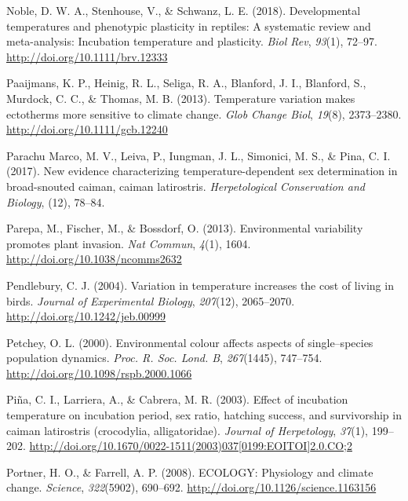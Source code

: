 \documentclass[12pt,twoside]{reedthesis}
\begin{document}
\leavevmode\hypertarget{ref-noble_developmental_2018}{}%
Noble, D. W. A., Stenhouse, V., \& Schwanz, L. E. (2018). Developmental temperatures and phenotypic plasticity in reptiles: A systematic review and meta-analysis: Incubation temperature and plasticity. \emph{Biol Rev}, \emph{93}(1), 72--97. \url{http://doi.org/10.1111/brv.12333}

\leavevmode\hypertarget{ref-paaijmans_temperature_2013}{}%
Paaijmans, K. P., Heinig, R. L., Seliga, R. A., Blanford, J. I., Blanford, S., Murdock, C. C., \& Thomas, M. B. (2013). Temperature variation makes ectotherms more sensitive to climate change. \emph{Glob Change Biol}, \emph{19}(8), 2373--2380. \url{http://doi.org/10.1111/gcb.12240}

\leavevmode\hypertarget{ref-parachu_marco_new_2017}{}%
Parachu Marco, M. V., Leiva, P., Iungman, J. L., Simonici, M. S., \& Pina, C. I. (2017). New evidence characterizing temperature-dependent sex determination in broad-snouted caiman, caiman latirostris. \emph{Herpetological Conservation and Biology}, (12), 78--84.

\leavevmode\hypertarget{ref-parepa_environmental_2013}{}%
Parepa, M., Fischer, M., \& Bossdorf, O. (2013). Environmental variability promotes plant invasion. \emph{Nat Commun}, \emph{4}(1), 1604. \url{http://doi.org/10.1038/ncomms2632}

\leavevmode\hypertarget{ref-pendlebury_variation_2004-1}{}%
Pendlebury, C. J. (2004). Variation in temperature increases the cost of living in birds. \emph{Journal of Experimental Biology}, \emph{207}(12), 2065--2070. \url{http://doi.org/10.1242/jeb.00999}

\leavevmode\hypertarget{ref-petchey_environmental_2000}{}%
Petchey, O. L. (2000). Environmental colour affects aspects of single--species population dynamics. \emph{Proc. R. Soc. Lond. B}, \emph{267}(1445), 747--754. \url{http://doi.org/10.1098/rspb.2000.1066}

\leavevmode\hypertarget{ref-pina_effect_2003}{}%
Piña, C. I., Larriera, A., \& Cabrera, M. R. (2003). Effect of incubation temperature on incubation period, sex ratio, hatching success, and survivorship in caiman latirostris (crocodylia, alligatoridae). \emph{Journal of Herpetology}, \emph{37}(1), 199--202. \href{http://doi.org/10.1670/0022-1511(2003)037\%5B0199:EOITOI\%5D2.0.CO;2}{http://doi.org/10.1670/0022-1511(2003)037{[}0199:EOITOI{]}2.0.CO;2}

\leavevmode\hypertarget{ref-portner_ecology_2008}{}%
Portner, H. O., \& Farrell, A. P. (2008). ECOLOGY: Physiology and climate change. \emph{Science}, \emph{322}(5902), 690--692. \url{http://doi.org/10.1126/science.1163156}
\end{document}
